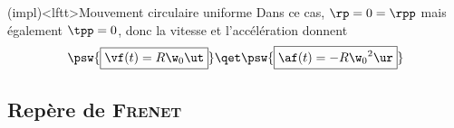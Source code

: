 \documentclass[../../main/main.tex]{subfiles}
\begin{document}
\begin{tcb}(impl)<lftt>{Mouvement circulaire uniforme}
  Dans ce cas, $\rp = 0 = \rpp$ mais également $\tpp = 0$, donc la vitesse et
  l'accélération donnent
\[
  \psw{\boxed{\vf(t) = R\w_0\ut}}
  \qet
  \psw{\boxed{\af(t) = -R\w_0{}^2\ur}}
\]
\vspace{-25pt}
\end{tcb}



\vspace*{-25pt}

\subsection{Repère de \textsc{Frenet}}
\end{document}
